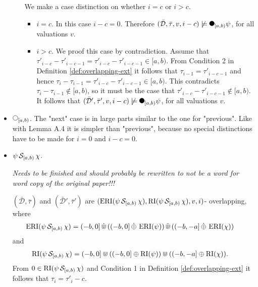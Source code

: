 \begin{itemize}
\begin{itemize}
                We make a case distinction on whether $i=c$ or $i>c$.
                \begin{itemize}
                    \item
                        $i=c$.
                        In this case $i-c = 0$.
                        Therefore $(\bar{\mathcal{D}}, \bar{\tau}, v, i-c) \not\models \Previous{[a,b)} \psi$, for all valuations $v$.
                    \item
                        $i>c$.
                        We proof this case by contradiction.
                        Assume that $\tau'_{i-c} - \tau'_{i-c-1} = \tau'_{i-c} - \tau'_{i-c-1} \in [a,b)$.
                        From Condition 2 in Definition \ref{def:overlapping-ext} it follows that $\tau_{i-1} = \tau'_{i-c-1}$ and hence $\tau_i - \tau_{i-1} = \tau'_{i-c} - \tau'_{i-c-1} \in [a,b)$.
                        This contradicts $\tau_i - \tau_{i-1} \not\in [a,b)$, so it must be the case that $\tau'_{i-c} - \tau'_{i-c-1} \not\in [a,b)$.
                        It follows that $(\bar{\mathcal{D}}', \bar{\tau}', v, i-c) \not\models \Previous{[a,b)} \psi$, for all valuations $v$.
                \end{itemize}
        \end{itemize}
    \item
        $\Next{[a,b)}$.
        The "next" case is in large parts similar to the one for "previous".
        Like with Lemma A.4 \cite{Basin2016} it is simpler than "previous", because no special distinctions have to be made for $i=0$ and $i-c=0$.
    \item
        $\psi \,\mathcal{S}_{[a,b)}\, \chi$.

        \textit{Needs to be finished and should probably be rewritten to not be a word for word copy of the original paper!!!}

        $(\bar{\mathcal{D}},\bar{\tau})$ and $(\bar{\mathcal{D}}',\bar{\tau}')$ are $(\operatorname{ERI}(\psi \,\mathcal{S}_{[a,b)}\, \chi), \operatorname{RI}(\psi \,\mathcal{S}_{[a,b)}\, \chi), v, i)$- overlapping, where
        \begin{align*}
            \operatorname{ERI}(\psi \,\mathcal{S}_{[a,b)}\, \chi)
            &= (-b,0] \,\dot{\Cup}\, ((-b,0] \,\dot{\oplus}\, \operatorname{ERI}(\psi)) \,\ddot{\Cup}\, ((-b,-a] \,\dot{\oplus}\, \operatorname{ERI}(\chi))
        \end{align*}
        and
        \begin{align*}
            \operatorname{RI}(\psi \,\mathcal{S}_{[a,b)}\, \chi)
            &= (-b,0] \Cup ((-b,0] \oplus \operatorname{RI}(\psi)) \Cup ((-b,-a] \oplus \operatorname{RI}(\chi)).
        \end{align*}
        From $0 \in \operatorname{RI}(\psi \,\mathcal{S}_{[a,b)}\, \chi)$ and Condition 1 in Definition \ref{def:overlapping-ext} it follows that $\tau_i = \tau'_i-c$.


\end{itemize}
